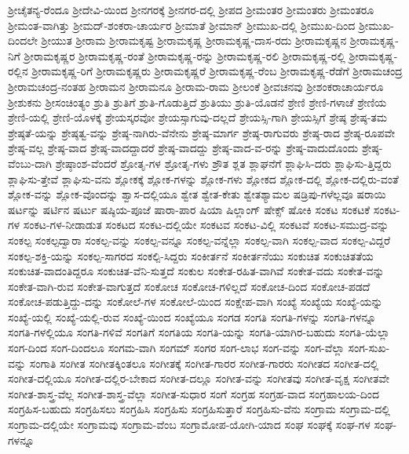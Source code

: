 {ಶ್ರೀಚೈತನ್ಯ-ರೆಂದೂ
ಶ್ರೀದೇವಿ-ಯಿಂದ
ಶ್ರೀನಗರಕ್ಕೆ
ಶ್ರೀನಗರ-ದಲ್ಲಿ
ಶ್ರೀಪದ
ಶ್ರೀಮಂತರ
ಶ್ರೀಮಂತರು
ಶ್ರೀಮಂತರೂ
ಶ್ರೀಮಂತ-ವಾಗಿತ್ತು
ಶ್ರೀಮದ್-ಶಂಕರಾ-ಚಾರ್ಯರ
ಶ್ರೀಮಾತೆ
ಶ್ರೀಮಾನ್
ಶ್ರೀಮುಖ-ದಲ್ಲಿ
ಶ್ರೀಮುಖ-ದಿಂದ
ಶ್ರೀಮುಖ-ದಿಂದಲೇ
ಶ್ರೀಯುತ
ಶ್ರೀರಾಮ
ಶ್ರೀರಾಮಕೃಷ್ಟ
ಶ್ರೀರಾಮಕೃಷ್ಣ
ಶ್ರೀರಾಮಕೃಷ್ಣ-ದಾಸ-ರದು
ಶ್ರೀರಾಮಕೃಷ್ಣನ
ಶ್ರೀರಾಮಕೃಷ್ಣ-ನಿಗೆ
ಶ್ರೀರಾಮಕೃಷ್ಣರ
ಶ್ರೀರಾಮಕೃಷ್ಣ-ರಂತೆ
ಶ್ರೀರಾಮಕೃಷ್ಣ-ರನ್ನು
ಶ್ರೀರಾಮಕೃಷ್ಣ-ರಲಿ
ಶ್ರೀರಾಮಕೃಷ್ಣ-ರಲ್ಲಿ
ಶ್ರೀರಾಮಕೃಷ್ಣ-ರಲ್ಲಿನ
ಶ್ರೀರಾಮಕೃಷ್ಣ-ರಿಗೆ
ಶ್ರೀರಾಮಕೃಷ್ಣರು
ಶ್ರೀರಾಮಕೃಷ್ಣರೆ
ಶ್ರೀರಾಮಕೃಷ್ಣ-ರೆಂಬ
ಶ್ರೀರಾಮಕೃಷ್ಣ-ರೆಡೆಗೆ
ಶ್ರೀರಾಮಚಂದ್ರ
ಶ್ರೀರಾಮಚಂದ್ರ-ನಂತಹ
ಶ್ರೀರಾಮನ
ಶ್ರೀರಾಮನೂ
ಶ್ರೀರಾಮ-ರಾಮ
ಶ್ರೀಲಂಕೆ
ಶ್ರೀವಚನವು
ಶ್ರೀಶಂಕರಾಚಾರ್ಯರೂ
ಶ್ರೀಶುಕನು
ಶ್ರೀಸಂಚಿಂತ್ಯಂ
ಶ್ರುತಿ
ಶ್ರುತಿಗೆ
ಶ್ರುತಿ-ಗೊಡುತ್ತಿದೆ
ಶ್ರುತಿಯು
ಶ್ರುತಿ-ಯೊಡನೆ
ಶ್ರೇಣಿ
ಶ್ರೇಣಿ-ಗಳಾಚೆ
ಶ್ರೇಣಿಯ
ಶ್ರೇಣಿ-ಯಲ್ಲಿ
ಶ್ರೇಣಿ-ಯೊಳಕ್ಕೆ
ಶ್ರೇಯಸ್ಕರವೋ
ಶ್ರೇಯಸ್ಸಾಗುವು-ದಲ್ಲದೆ
ಶ್ರೇಯಸ್ಸಿ-ಗಾಗಿ
ಶ್ರೇಯಸ್ಸಿಗೆ
ಶ್ರೇಷ್ಠ
ಶ್ರೇಷ್ಠ-ತಮ
ಶ್ರೇಷ್ಠತೆ-ಯನ್ನು
ಶ್ರೇಷ್ಠತ್ವ-ವನ್ನು
ಶ್ರೇಷ್ಠ-ನಾಗಿರು-ವೆನೇನು
ಶ್ರೇಷ್ಠ-ಮಾರ್ಗ
ಶ್ರೇಷ್ಠ-ರಾಗುವರು
ಶ್ರೇಷ್ಠ-ರಾದ
ಶ್ರೇಷ್ಠ-ರೂಪವೇ
ಶ್ರೇಷ್ಠ-ವಲ್ಲ
ಶ್ರೇಷ್ಠ-ವಾದ
ಶ್ರೇಷ್ಠ-ವಾದದ್ದಾದರೆ
ಶ್ರೇಷ್ಠ-ವಾದದ್ದು
ಶ್ರೇಷ್ಠ-ವಾದ-ವ-ರನ್ನು
ಶ್ರೇಷ್ಠ-ವಾದುದೊಂದು
ಶ್ರೇಷ್ಠ-ವೆಂಬು-ದಾಗಿ
ಶ್ರೇಷ್ಠಾಂಶ-ವೆಂದರೆ
ಶ್ರೋತೃ-ಗಳ
ಶ್ರೋತೃ-ಗಳು
ಶ್ರೌತ
ಶ್ಲತ
ಶ್ಲಾಘನೆಗೆ
ಶ್ಲಾಘಿಸಿ-ದರು
ಶ್ಲಾಘಿಸು-ತ್ತಿದ್ದರು
ಶ್ಲಾಘಿಸು-ತ್ತೇವೆ
ಶ್ಲಾಘಿಸು-ವನು
ಶ್ಲೋಕಕ್ಕೆ
ಶ್ಲೋಕ-ಗಳನ್ನು
ಶ್ಲೋಕ-ಗಳು
ಶ್ಲೋಕದ
ಶ್ಲೋಕ-ದಲ್ಲಿ
ಶ್ಲೋಕ-ದಲ್ಲಿರು-ವಂತೆ
ಶ್ಲೋಕ-ವನ್ನು
ಶ್ಲೋಕ-ವೊಂದನ್ನು
ಶ್ವಾಸ-ದಲ್ಲಿಯೂ
ಶ್ವೇತ
ಶ್ವೇತ-ಕೇತು
ಶ್ವೇತಶ್ಯಾಮಲ
ಷಡ್ರಿಪು-ಗಳೆಲ್ಲವೂ
ಷರಾಯಿ
ಷರ್ಟನ್ನು
ಷರ್ಟಿನ
ಷರ್ಟು
ಷಷ್ಠಿಯ-ಪೂಜೆ
ಷಾರಾ-ಪಾರ
ಷಿಯಾ
ಷಿಲ್ಲಾಂಗ್
ಷೇಕ್ಸ್
ಷೋಕಿ
ಸಂಕಟ
ಸಂಕಟಕೆ
ಸಂಕಟ-ಗಳ
ಸಂಕಟ-ಗಳ-ನೀಡಾಡುತ
ಸಂಕಟದ
ಸಂಕಟ-ದಲ್ಲಿಯೇ
ಸಂಕಟವ
ಸಂಕಟ-ವಿಲ್ಲಿ
ಸಂಕಟವೆ
ಸಂಕಟ-ಸಮುದ್ರ-ವನ್ನು
ಸಂಕಲ್ಪ
ಸಂಕಲ್ಪದ್ವಾರಾ
ಸಂಕಲ್ಪ-ವನ್ನು
ಸಂಕಲ್ಪ-ವನ್ನೂ
ಸಂಕಲ್ಪ-ವನ್ನೆಲ್ಲಾ
ಸಂಕಲ್ಪ-ವಾಗಿ
ಸಂಕಲ್ಪ-ವಾದ
ಸಂಕಲ್ಪ-ವಿದ್ದರೆ
ಸಂಕಲ್ಪ-ಶಕ್ತಿ-ಯನ್ನು
ಸಂಕಲ್ಪ-ಸಾಗರದ
ಸಂಕಲ್ಪಿ-ಸಿದ್ದರು
ಸಂಕೀರ್ತನೆ
ಸಂಕೀರ್ತನೆಯು
ಸಂಕುಚಿತ
ಸಂಕುಚಿತತೆಯ
ಸಂಕುಚಿತ-ವಾದಂತಿದ್ದರೂ
ಸಂಕುಚಿತ-ವೆನಿ-ಸುತ್ತದೆ
ಸಂಕುಲ
ಸಂಕೇತ-ರಹಿತ-ವಾಗಿವೆ
ಸಂಕೇತ-ವದು
ಸಂಕೇತ-ವನ್ನು
ಸಂಕೇತ-ವಾಗಿ-ರುವ
ಸಂಕೇತ-ವಾಗುತ್ತದೆ
ಸಂಕೋಚ
ಸಂಕೋಚ-ಗಳಿಲ್ಲದೆ
ಸಂಕೋಚ-ದಿಂದ
ಸಂಕೋಚ-ಪಡದೆ
ಸಂಕೋಚ-ಪಡುತ್ತಿದ್ದು-ದನ್ನು
ಸಂಕೋಲೆ-ಗಳ
ಸಂಕೋಲೆ-ಯಿಂದ
ಸಂಕ್ಷೇಪ-ವಾಗಿ
ಸಂಖ್ಯೆ
ಸಂಖ್ಯೆಯ
ಸಂಖ್ಯೆ-ಯನ್ನು
ಸಂಖ್ಯೆ-ಯಲ್ಲಿ
ಸಂಖ್ಯೆ-ಯಲ್ಲಿ-ರುವ
ಸಂಖ್ಯೆ-ಯಿಂದ
ಸಂಖ್ಯೆಯೂ
ಸಂಗಡ
ಸಂಗತಿ
ಸಂಗತಿ-ಗಳನ್ನು
ಸಂಗತಿ-ಗಳನ್ನೂ
ಸಂಗತಿ-ಗಳಲ್ಲಿಯೂ
ಸಂಗತಿ-ಗಳಿವೆ
ಸಂಗತಿಗೆ
ಸಂಗತಿಯ
ಸಂಗತಿ-ಯನ್ನು
ಸಂಗತಿ-ಯಾಗಿರ-ಬಹುದು
ಸಂಗತಿ-ಯೆಲ್ಲಾ
ಸಂಗ-ದಿಂದ
ಸಂಗ-ದಿಂದಲೂ
ಸಂಗಮ-ವಾಗಿ
ಸಂಗಮ್
ಸಂಗರ
ಸಂಗ-ಲಾಭ
ಸಂಗ-ವನ್ನು
ಸಂಗ-ವೆಲ್ಲಾ
ಸಂಗ-ಸುಖ-ವನ್ನು
ಸಂಗಾತಿ
ಸಂಗೀತ
ಸಂಗೀತಕ್ಕಿಂತಲೂ
ಸಂಗೀತಕ್ಕೆ
ಸಂಗೀತ-ಗಾರರ
ಸಂಗೀತ-ಗಾರರು
ಸಂಗೀತದ
ಸಂಗೀತ-ದಲ್ಲಿ
ಸಂಗೀತ-ದಲ್ಲಿಯೂ
ಸಂಗೀತ-ದಲ್ಲಿರ-ಬೇಕಾದ
ಸಂಗೀತ-ದಲ್ಲೂ
ಸಂಗೀತ-ವನ್ನು
ಸಂಗೀತವು
ಸಂಗೀತ-ವೃಕ್ಷ
ಸಂಗೀತವೇ
ಸಂಗೀತ-ಶಾಸ್ತ್ರ-ವೆಲ್ಲ
ಸಂಗೀತ-ಶಾಸ್ತ್ರ-ವೆಲ್ಲಾ
ಸಂಗೀತ-ಸುಧಾರ
ಸಂಗೆ
ಸಂಗ್ರಹ
ಸಂಗ್ರಹ-ವಾದ
ಸಂಗ್ರಹಾಲಯ-ದಿಂದ
ಸಂಗ್ರಹಿಸ-ಬಹುದು
ಸಂಗ್ರಹಿಸಲು
ಸಂಗ್ರಹಿಸಿ
ಸಂಗ್ರಹಿಸು
ಸಂಗ್ರಹಿಸುತ್ತಾರೆ
ಸಂಗ್ರಹಿಸು-ವೆನು
ಸಂಗ್ರಾಮ
ಸಂಗ್ರಾಮ-ದಲ್ಲಿ
ಸಂಗ್ರಾಮ-ದಲ್ಲಿಯೇ
ಸಂಗ್ರಾಮವು
ಸಂಗ್ರಾಮ-ವೆಂಬ
ಸಂಗ್ರಾಮೋಪ-ಯೋಗಿ-ಯಾದ
ಸಂಘ
ಸಂಘಕ್ಕೆ
ಸಂಘ-ಗಳ
ಸಂಘ-ಗಳನ್ನೂ
}
